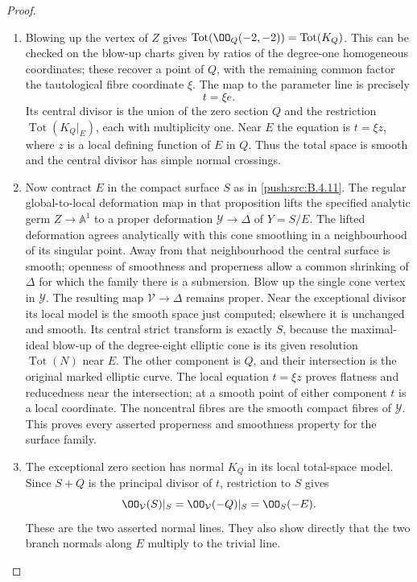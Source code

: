 \begin{proof}
\begin{enumerate}[label=\arabic*.,leftmargin=*]
\item Blowing up the vertex of $Z$ gives
$\operatorname{Tot}(\OO_Q(-2,-2))=\operatorname{Tot}(K_Q)$.
This can be checked on the blow-up charts given by ratios of the
degree-one homogeneous coordinates; these recover a point of
$Q$, with the remaining common factor the tautological fibre
coordinate $\xi$.
The map to the parameter line is precisely
\[
 t=\xi e.
\]
Its central divisor is the union of the zero section $Q$ and
the restriction $\operatorname{Tot}(K_Q|_E)$, each with
multiplicity one.  Near $E$ the equation is $t=\xi z$, where
$z$ is a local defining function of $E$ in $Q$.
Thus the total space is smooth and the central divisor has
simple normal crossings.

\item Now contract $E$ in the compact surface $S$ as in \ref{push:src:B.4.11}.
The regular global-to-local deformation map in that proposition
lifts the specified analytic germ $Z\to\mathbb A^1$ to a proper
deformation $\mathcal Y\to\Delta$ of $Y=S/E$.
The lifted deformation agrees analytically with this cone
smoothing in a neighbourhood of its singular point.
Away from that neighbourhood the central surface is smooth;
openness of smoothness and properness allow a common shrinking
of $\Delta$ for which the family there is a submersion.
Blow up the single cone vertex in $\mathcal Y$.
The resulting map $\mathcal V\to\Delta$ remains proper.
Near the exceptional divisor its local model is the smooth
space just computed; elsewhere it is unchanged and smooth.
Its central strict transform is exactly $S$, because the
maximal-ideal blow-up of the degree-eight elliptic cone is its
given resolution $\operatorname{Tot}(N)$ near $E$.
The other component is $Q$, and their intersection is the original
marked elliptic curve.  The local equation $t=\xi z$ proves
flatness and reducedness near the intersection; at a smooth
point of either component $t$ is a local coordinate.
The noncentral fibres are the smooth compact fibres of
$\mathcal Y$.
This proves every asserted properness and smoothness property
for the surface family.

\item The exceptional zero section has normal $K_Q$ in its local
total-space model.  Since $S+Q$ is the principal divisor of $t$,
restriction to $S$ gives
\[
 \OO_{\mathcal V}(S)|_S
   =\OO_{\mathcal V}(-Q)|_S=\OO_S(-E).
\]
These are the two asserted normal lines.  They also show directly
that the two branch normals along $E$ multiply to the trivial line.


\end{enumerate}
\end{proof}

